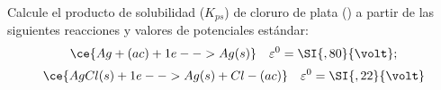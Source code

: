 Calcule el producto de solubilidad ($K_{ps}$) de cloruro de plata () a partir de las siguientes reacciones y valores de potenciales estándar:
    	$$
	    	\ce{Ag+(ac) + 1e- -> Ag(s)}\quad\varepsilon^0 = \SI{,80}{\volt};
    	$$
    	$$
	    	\ce{AgCl(s) + 1e- -> Ag(s) + Cl-(ac)}\quad\varepsilon^0 = \SI{,22}{\volt}
    	$$
